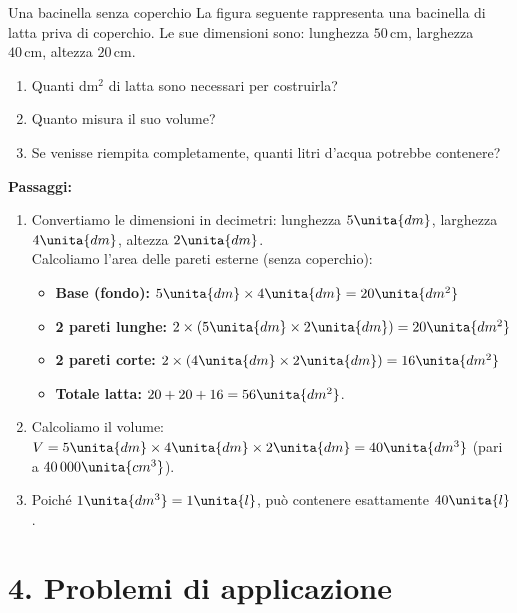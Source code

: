 \begin{esercizio}{Una bacinella senza coperchio}
La figura seguente rappresenta una bacinella di latta priva di coperchio. Le sue dimensioni sono: lunghezza $50\,\mathrm{cm}$, larghezza $40\,\mathrm{cm}$, altezza $20\,\mathrm{cm}$.


\begin{enumerate}[label=\alph*)]
  \item Quanti $\mathrm{dm^2}$ di latta sono necessari per costruirla?
  \item Quanto misura il suo volume?
  \item Se venisse riempita completamente, quanti litri d'acqua potrebbe contenere?
\end{enumerate}

\responsespace{4.2cm}

\begin{soluzione}
  \textbf{Passaggi:}
  \begin{enumerate}[label=\alph*)]
    \item Convertiamo le dimensioni in decimetri: lunghezza $5\unita{dm}$, larghezza $4\unita{dm}$, altezza $2\unita{dm}$.\\
    Calcoliamo l'area delle pareti esterne (senza coperchio):
    \begin{itemize}
      \item \textbf{Base (fondo):} $5\unita{dm} \times 4\unita{dm} = 20\unita{dm^2}$
      \item \textbf{2 pareti lunghe:} $2 \times (5\unita{dm} \times 2\unita{dm}) = 20\unita{dm^2}$
      \item \textbf{2 pareti corte:} $2 \times (4\unita{dm} \times 2\unita{dm}) = 16\unita{dm^2}$
      \item \textbf{Totale latta:} $20 + 20 + 16 = 56\unita{dm^2}$.
    \end{itemize}
    \item Calcoliamo il volume: $V = 5\unita{dm} \times 4\unita{dm} \times 2\unita{dm} = 40\unita{dm^3}$ (pari a $40\,000\unita{cm^3}$).
    \item Poiché $1\unita{dm^3} = 1\unita{l}$, può contenere esattamente $40\unita{l}$.
  \end{enumerate}
\end{soluzione}
\end{esercizio}

\condnewpage

\section*{4. Problemi di applicazione}

